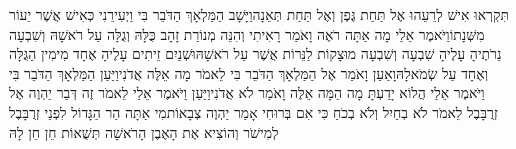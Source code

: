 \documentclass[../main/main.tex]{subfiles}
\begin{document}
\begin{multicols*}{\ncols}
תִּקְרְאוּ אִישׁ לְרֵעֵהוּ אֶל תַּחַת גֶּפֶן וְאֶל תַּחַת תְּאֵנָה\PreChapterSpace{}וַיָּשָׁב הַמַּלְאָךְ הַדֹּבֵר בִּי וַיְעִירֵנִי כְּאִישׁ אֲשֶׁר יֵעוֹר מִשְּׁנָתוֹ\PreVerseSpace{}וַיֹּאמֶר אֵלַי מָה אַתָּה רֹאֶה וָאֹמַר\SubEnd{} רָאִיתִי וְהִנֵּה מְנוֹרַת זָהָב כֻּלָּהּ וְגֻלָּה עַל רֹאשָׁהּ וְשִׁבְעָה נֵרֹתֶיהָ עָלֶיהָ שִׁבְעָה וְשִׁבְעָה מוּצָקוֹת לַנֵּרוֹת אֲשֶׁר עַל רֹאשָׁהּ\PreVerseSpace{}וּשְׁנַיִם זֵיתִים עָלֶיהָ אֶחָד מִימִין הַגֻּלָּה וְאֶחָד עַל שְׂמֹאלָהּ\PreVerseSpace{}וָאַעַן וָאֹמַר אֶל הַמַּלְאָךְ הַדֹּבֵר בִּי לֵאמֹר מָה אֵלֶּה אֲדֹנִי\PreVerseSpace{}וַיַּעַן הַמַּלְאָךְ הַדֹּבֵר בִּי וַיֹּאמֶר אֵלַי הֲלוֹא יָדַעְתָּ מָה הֵמָּה אֵלֶּה וָאֹמַר לֹא אֲדֹנִי\PreVerseSpace{}וַיַּעַן וַיֹּאמֶר אֵלַי לֵאמֹר זֶה דְּבַר יַהְוֶה אֶל זְרֻבָּבֶל לֵאמֹר לֹא בְחַיִל וְלֹא בְכֹחַ כִּי אִם בְּרוּחִי אָמַר יַהְוֶה צְבָאוֹת\PreVerseSpace{}מִי אַתָּה הַר הַגָּדוֹל לִפְנֵי זְרֻבָּבֶל לְמִישֹׁר וְהוֹצִיא אֶת הָאֶבֶן הָרֹאשָׁה תְּשֻׁאוֹת חֵן חֵן לָהּ\OpenSection{}\par

\end{multicols*}
\end{document}
